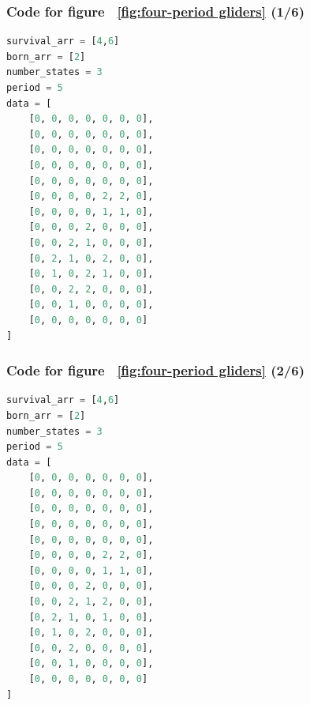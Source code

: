 \documentclass[12pt]{article}
\numberwithin{figure}{section} %
\begin{document}
\noindent\begin{minipage}{.45\textwidth}
\subsubsection{Code for figure ~\ref{fig:four-period gliders} (1/6)}
\label{subsubsection:four-period gliders(1/6)}
\begin{lstlisting}[language = Python]
survival_arr = [4,6]
born_arr = [2]
number_states = 3
period = 5
data = [
    [0, 0, 0, 0, 0, 0, 0],
    [0, 0, 0, 0, 0, 0, 0],
    [0, 0, 0, 0, 0, 0, 0],
    [0, 0, 0, 0, 0, 0, 0],
    [0, 0, 0, 0, 0, 0, 0],
    [0, 0, 0, 0, 2, 2, 0],
    [0, 0, 0, 0, 1, 1, 0],
    [0, 0, 0, 2, 0, 0, 0],
    [0, 0, 2, 1, 0, 0, 0],
    [0, 2, 1, 0, 2, 0, 0],
    [0, 1, 0, 2, 1, 0, 0],
    [0, 0, 2, 2, 0, 0, 0],
    [0, 0, 1, 0, 0, 0, 0],
    [0, 0, 0, 0, 0, 0, 0]
]

\end{lstlisting}
\end{minipage}\hfill
\begin{minipage}{.45\textwidth}
\subsubsection{Code for figure ~\ref{fig:four-period gliders} (2/6)}
\label{subsubsection:four-period gliders(2/6)}
\begin{lstlisting}[language = Python]
survival_arr = [4,6]
born_arr = [2]
number_states = 3
period = 5
data = [
    [0, 0, 0, 0, 0, 0, 0],
    [0, 0, 0, 0, 0, 0, 0],
    [0, 0, 0, 0, 0, 0, 0],
    [0, 0, 0, 0, 0, 0, 0],
    [0, 0, 0, 0, 0, 0, 0],
    [0, 0, 0, 0, 2, 2, 0],
    [0, 0, 0, 0, 1, 1, 0],
    [0, 0, 0, 2, 0, 0, 0],
    [0, 0, 2, 1, 2, 0, 0],
    [0, 2, 1, 0, 1, 0, 0],
    [0, 1, 0, 2, 0, 0, 0],
    [0, 0, 2, 0, 0, 0, 0],
    [0, 0, 1, 0, 0, 0, 0],
    [0, 0, 0, 0, 0, 0, 0]
]
\end{lstlisting}
\end{minipage}
\end{document}
